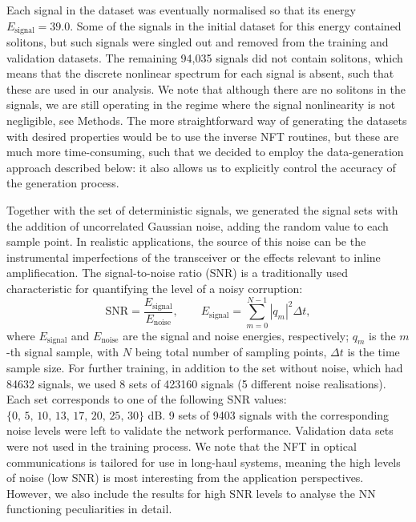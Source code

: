 Each signal in the dataset was eventually normalised so that its energy $E_{\text{signal}} = 39.0$. 
Some of the signals in the initial dataset for this energy contained solitons, but such signals were singled out and removed from the training and validation datasets. 
The remaining 94,035 signals did not contain solitons, which means that the discrete nonlinear spectrum for each signal is absent, such that these are used in our analysis.
We note that although there are no solitons in the signals, we are still operating in the regime where the signal nonlinearity is not negligible, see Methods. The more straightforward way of generating the datasets with desired properties would be to use the inverse NFT routines, but these are much more time-consuming, such that we decided to employ the data-generation approach described below: it also allows us to explicitly control the accuracy of the generation process. 


Together with the set of deterministic signals, we generated the signal sets with the addition of uncorrelated Gaussian noise, adding the random value to each sample point. In realistic applications, the source of this noise can be the instrumental imperfections of the transceiver or the effects relevant to inline amplifiecation\cite{a12}. The signal-to-noise ratio (SNR) is a traditionally used characteristic for quantifying  the level of a noisy corruption: 
\begin{equation}
    \text{SNR} = \frac{E_{\text{signal}}}{E_{\text{noise}}} {,} \qquad
    E_{\text{signal}} = \sum_{m = 0}^{N - 1} |q_m|^2 \Delta t {,}
    \label{eq:snr}
\end{equation}
where $E_{\text{signal}}$ and $E_{\text{noise}}$ are the signal and noise energies, respectively; $q_m$ is the $m$-th signal sample, with $N$ being total number of sampling points, $\Delta t$ is the time sample size. For further training, in addition to the set without noise, which had 84632 signals, we used 8 sets of 423160 signals (5 different noise realisations). Each set corresponds to one of the following SNR values: $\{0, \, 5, \,10, \, 13, \, 17, \, 20, \, 25, \, 30\}$ dB. 
9 sets of 9403 signals with the corresponding noise levels were left to validate the network performance. Validation data sets were not used in the training process. 
We note that the NFT in optical communications is tailored for use in long-haul systems, meaning the high levels of noise (low SNR) is most interesting from the application perspectives. However, we also include the results for high SNR levels to analyse the NN functioning peculiarities in detail.



